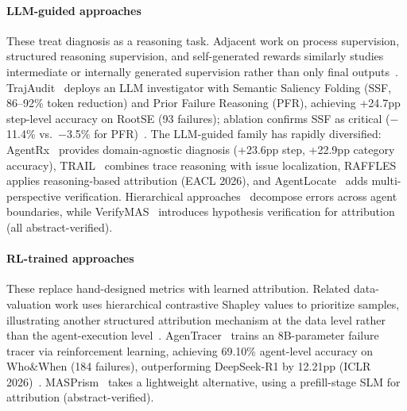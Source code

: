 \paragraph*{LLM-guided approaches}
These treat diagnosis as a reasoning task. Adjacent work on process supervision, structured reasoning supervision, and self-generated rewards similarly studies intermediate or internally generated supervision rather than only final outputs~\cite{liu-etal-2026-ips,jiang-etal-2026-drp,jiang2026scribestructuredmidlevelsupervision,lin2026cec}. TrajAudit~\cite{trajaudit2026} deploys an LLM investigator with Semantic Saliency Folding (SSF, 86--92\% token reduction) and Prior Failure Reasoning (PFR), achieving +24.7pp step-level accuracy on RootSE (93 failures); ablation confirms SSF as critical ($-$11.4\% vs.\ $-$3.5\% for PFR)~\cite{trajaudit2026}. The LLM-guided family has rapidly diversified: AgentRx~\cite{agentrx2026} provides domain-agnostic diagnosis (+23.6pp step, +22.9pp category accuracy), TRAIL~\cite{trail2025} combines trace reasoning with issue localization, RAFFLES~\cite{raffles2026} applies reasoning-based attribution (EACL 2026), and AgentLocate~\cite{agentlocate2026} adds multi-perspective verification. Hierarchical approaches~\cite{hierrerror2025} decompose errors across agent boundaries, while VerifyMAS~\cite{verifymas2026} introduces hypothesis verification for attribution (all abstract-verified).

\paragraph*{RL-trained approaches}
These replace hand-designed metrics with learned attribution. Related data-valuation work uses hierarchical contrastive Shapley values to prioritize samples, illustrating another structured attribution mechanism at the data level rather than the agent-execution level~\cite{xiao2026points}. AgenTracer~\cite{agentracer2026} trains an 8B-parameter failure tracer via reinforcement learning, achieving 69.10\% agent-level accuracy on Who\&When (184 failures), outperforming DeepSeek-R1 by 12.21pp (ICLR 2026)~\cite{agentracer2026}. MASPrism~\cite{masprism2026} takes a lightweight alternative, using a prefill-stage SLM for attribution (abstract-verified).

